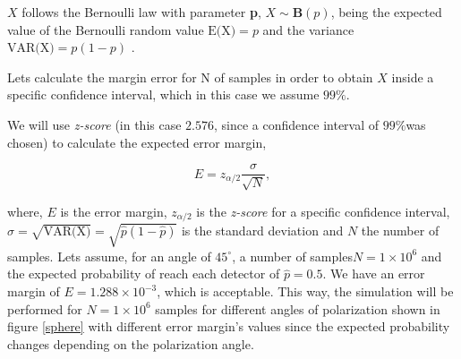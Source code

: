 $X$ follows the Bernoulli law with parameter \textbf{p}, $X \sim \mathbf{B}(p)$, being the expected value of the Bernoulli random value $\textrm{E(X)}=p$ and the variance $\textrm{VAR(X)}=p(1-p)$ \cite{probabilitySheldon}.

Lets calculate the margin error for N of samples in order to obtain $X$ inside a specific confidence interval, which in this case we assume $99\%$.

We will use \textit{z-score }(in this case $2.576$, since a confidence interval of $99\%$was chosen) to calculate the expected error margin,

\begin{equation}\label{eq:marginerror}
  E = z_{\alpha/2}\frac{\sigma}{\sqrt{N}},
  \nonumber
\end{equation}

where, $E$ is the error margin, $z_{\alpha/2}$ is the \textit{z-score} for a specific confidence interval, $\sigma = \sqrt{\textrm{VAR(X})} = \sqrt{\hat{p}(1-\hat{p})}$ is the standard deviation and $N$ the number of samples. Lets assume, for an angle of $45^{\circ}$, a number of samples$N=1 \times 10^{6}$ and the expected probability of reach each detector of $\hat{p} = 0.5$. We have an error margin of $E = 1.288 \times 10 ^{-3}$, which is acceptable. This way, the simulation will be performed for $N=1 \times 10^{6}$ samples for different angles of polarization shown in figure \ref{sphere} with different error margin's values since the expected probability changes depending on the polarization angle.

